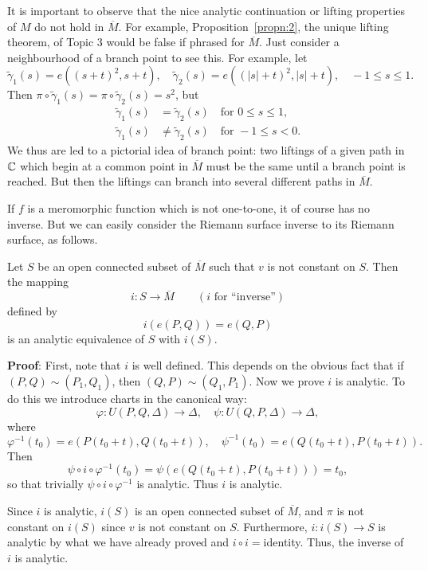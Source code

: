 \documentclass[a4paper,11pt]{article}
\begin{document}
It is important to observe that the nice analytic continuation or
lifting properties of $M$ do not hold in $\overline{M}$.  For example,
Proposition~\ref{propn:2}, the unique lifting theorem, of Topic 3
would be false if phrased for $\overline{M}$.  Just consider a
neighbourhood of a branch point to see this.  For example, let
$$
\widetilde{\gamma}_1(s) = e((s+t)^2, s+t), \quad
\widetilde{\gamma}_2(s) = e((|s|+t)^2, |s|+t), \quad
-1 \le s \le 1.
$$
Then $\pi \circ \widetilde{\gamma}_1(s) = \pi \circ
\widetilde{\gamma}_2(s) = s^2$, but
$$
\begin{aligned}
\widetilde{\gamma}_1(s) &= \widetilde{\gamma}_2(s) \quad \text{for } 0
\le s \le 1,\\
\widetilde{\gamma}_1(s) &\ne \widetilde{\gamma}_2(s) \quad \text{for } -1
\le s < 0.
\end{aligned}
$$
We thus are led to a pictorial idea of branch point: two liftings of a
given path in ${\mathbb C}$ which begin at a common point in $\overline{M}$
must be the same until a branch point is reached.  But then the
liftings can branch into several different paths in $\overline{M}$.

If $f$ is a meromorphic function which is not one-to-one, it of course
has no inverse.  But we can easily consider the Riemann surface
inverse to its Riemann surface, as follows.

\begin{propn}
  \label{propn:8}
  Let $S$ be an open connected subset of $\overline{M}$ such that $v$
  is not constant on $S$.  Then the mapping
  $$
  i : S \to \overline{M}\qquad (i\text{ for ``inverse''})
  $$
  defined by
  $$
  i(e(P,Q)) = e(Q,P)
  $$
  is an analytic equivalence of $S$ with $i(S)$.
\end{propn}

\begin{mdframed}
  \textbf{Proof}: First, note that $i$ is well defined.  This depends
  on the obvious fact that if $(P,Q) \sim (P_1, Q_1)$, then $(Q,P)
  \sim (Q_1, P_1)$.  Now we prove $i$ is analytic.  To do this we
  introduce charts in the canonical way:
  $$
  \varphi : U(P,Q,\Delta) \to \Delta,\quad
  \psi : U(Q,P,\Delta) \to \Delta,
  $$
  where
  $$
  \varphi^{-1}(t_0) = e(P(t_0 + t), Q(t_0 + t)),\quad
  \psi^{-1}(t_0) = e(Q(t_0 + t), P(t_0 + t)).
  $$
  Then
  $$
  \psi \circ i \circ \varphi^{-1}(t_0)
  = \psi(e(Q(t_0 + t), P(t_0 + t))) = t_0,
  $$
  so that trivially $\psi \circ i \circ \varphi^{-1}$ is analytic.
  Thus $i$ is analytic.

  Since $i$ is analytic, $i(S)$ is an open connected subset of
  $\overline{M}$, and $\pi$ is not constant on $i(S)$ since $v$ is not
  constant on $S$.  Furthermore, $i : i(S) \to S$ is analytic by what
  we have already proved and $i \circ i = $identity.  Thus, the
  inverse of $i$ is analytic.
\end{mdframed}
\end{document}

